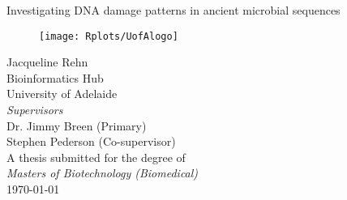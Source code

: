 \documentclass[12pt, a4paper]{article}
\begin{document}
	\begin{titlepage}
		\begin{center} 
		\huge{Investigating DNA damage patterns in ancient microbial sequences}\\[2cm]
		\begin{figure}[H]
		\centering
			\texttt{[image: Rplots/UofAlogo]}\\[2cm]
		\end{figure}
		\large{Jacqueline Rehn}\\[0.2cm]
		\large{Bioinformatics Hub}\\[0.2cm]
		\large{University of Adelaide}\\[1cm]
		\large\textit{Supervisors}\\[0.2cm]
		\large{Dr. Jimmy Breen (Primary)}\\[0.2cm]
		\large{Stephen Pederson (Co-supervisor)}\\[1cm]
		\large{A thesis submitted for the degree of}\\[0.2cm] 
		\large{\textit{Masters of Biotechnology (Biomedical)}}\\[0.2cm]
		\large{\today}\\[1cm]
		
		\end{center}
	\end{titlepage}
\doublespace
\justify
\sloppy

\tableofcontents
\thispagestyle{empty}
\cleardoublepage


\listoffigures
{}
\cleardoublepage

\listoftables
{}
\cleardoublepage


\singlespacing
\printnoidxglossary[style=altlist,title=Glossary]\label{sec:glossary}
\doublespacing
\newpage

\printnoidxglossary[type=\acronymtype,style=long, title=Acronyms]\label{sec:acronyms}
\newpage
\end{document}
